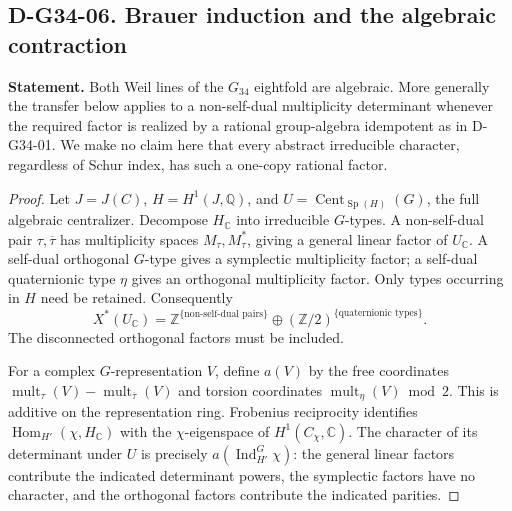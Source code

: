 \subsection*{D-G34-06. Brauer induction and the algebraic contraction}

\textbf{Statement.} Both Weil lines of the \(G_{34}\) eightfold are algebraic.
More generally the transfer below applies to a non-self-dual multiplicity
determinant whenever the required factor is realized by a rational
group-algebra idempotent as in D-G34-01.  We make no claim here that every
abstract irreducible character, regardless of Schur index, has such a
one-copy rational factor.

\begin{proof}
Let \(J=J(C)\), \(H=H^1(J,\mathbb Q)\), and
\(U=\operatorname{Cent}_{\operatorname{Sp}(H)}(G)\), the full algebraic
centralizer.  Decompose \(H_{\mathbb C}\) into irreducible \(G\)-types.
A non-self-dual pair \(\tau,\overline\tau\) has multiplicity spaces
\(M_\tau,M_\tau^*\), giving a general linear factor of \(U_{\mathbb C}\).
A self-dual orthogonal \(G\)-type gives a symplectic multiplicity factor;
a self-dual quaternionic type \(\eta\) gives an orthogonal multiplicity
factor.  Only types occurring in \(H\) need be retained.  Consequently
\[
 X^*(U_{\mathbb C})=
       \mathbb Z^{\{\text{non-self-dual pairs}\}}
       \oplus(\mathbb Z/2)^{\{\text{quaternionic types}\}}.
\]
The disconnected orthogonal factors must be included.

For a complex \(G\)-representation \(V\), define \(a(V)\) by the free
coordinates
\(\operatorname{mult}_\tau(V)-\operatorname{mult}_{\overline\tau}(V)\)
and torsion coordinates \(\operatorname{mult}_\eta(V)\bmod2\).
This is additive on the representation ring.  Frobenius reciprocity identifies
\(\operatorname{Hom}_{H'}(\chi,H_{\mathbb C})\) with the
\(\chi\)-eigenspace of \(H^1(C_\chi,\mathbb C)\).  The character of its
determinant under \(U\) is precisely \(a(\operatorname{Ind}_{H'}^G\chi)\):
the general linear factors contribute the indicated determinant powers,
the symplectic factors have no character, and the orthogonal factors
contribute the indicated parities.


\end{proof}
